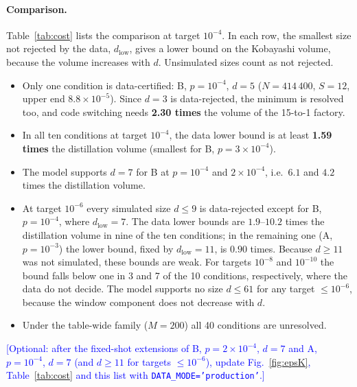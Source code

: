 \documentclass[a4paper]{article}
\newcommand{\blue}[1]{\textcolor{blue}{#1}}
\begin{document}
\paragraph{Comparison.}
Table~\ref{tab:cost} lists the comparison at target $10^{-4}$. In each row, the smallest size not rejected by the data, $d_{\mathrm{low}}$, gives a lower bound on the Kobayashi volume, because the volume increases with $d$. Unsimulated sizes count as not rejected.
\begin{itemize}[leftmargin=*,itemsep=0pt]
\item Only one condition is data-certified: B, $p=10^{-4}$, $d=5$ ($N=414\,400$, $S=12$, upper end $8.8\times10^{-5}$). Since $d=3$ is data-rejected, the minimum is resolved too, and code switching needs \textbf{2.30 times} the volume of the 15-to-1 factory.
\item In all ten conditions at target $10^{-4}$, the data lower bound is at least \textbf{1.59 times} the distillation volume (smallest for B, $p=3\times10^{-4}$).
\item The model supports $d=7$ for B at $p=10^{-4}$ and $2\times10^{-4}$, i.e.\ $6.1$ and $4.2$ times the distillation volume.
\item At target $10^{-6}$ every simulated size $d\le9$ is data-rejected except for B, $p=10^{-4}$, where $d_{\mathrm{low}}=7$. The data lower bounds are $1.9$--$10.2$ times the distillation volume in nine of the ten conditions; in the remaining one (A, $p=10^{-3}$) the lower bound, fixed by $d_{\mathrm{low}}=11$, is $0.90$ times. Because $d\ge11$ was not simulated, these bounds are weak. For targets $10^{-8}$ and $10^{-10}$ the bound falls below one in 3 and 7 of the 10 conditions, respectively, where the data do not decide. The model supports no size $d\le61$ for any target $\le10^{-6}$, because the window component does not decrease with $d$.
\item Under the table-wide family ($M=200$) all 40 conditions are unresolved.
\end{itemize}
\blue{[Optional: after the fixed-shot extensions of B, $p=2\times10^{-4}$, $d=7$ and A, $p=10^{-4}$, $d=7$ (and $d\ge11$ for targets $\le10^{-6}$), update Fig.~\ref{fig:epsK}, Table~\ref{tab:cost} and this list with \texttt{DATA\_MODE='production'}.]}
\end{document}
